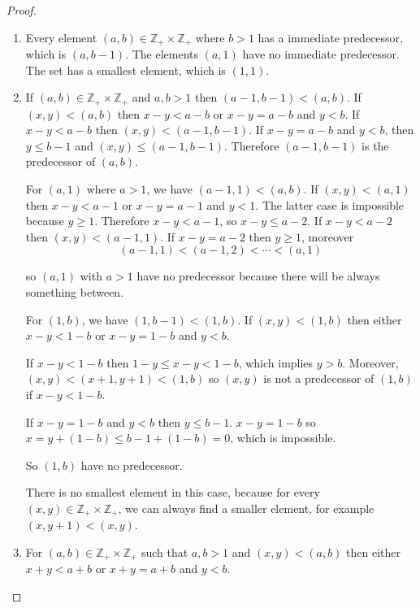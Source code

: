 \begin{proof}
    \begin{enumerate}[label={(\roman*)}]
        \item Every element $(a, b)\in \mathbb{Z}_{+}\times\mathbb{Z}_{+}$ where $b > 1$ has a immediate predecessor, which is $(a, b-1)$. The elements $(a, 1)$ have no immediate predecessor. The set has a smallest element, which is $(1, 1)$.
        \item If $(a, b)\in\mathbb{Z}_{+}\times\mathbb{Z}_{+}$ and $a, b > 1$ then $(a-1, b-1) < (a, b)$. If $(x, y) < (a, b)$ then $x - y < a - b$ or $x - y = a - b$ and $y < b$. If $x - y < a - b$ then $(x, y) < (a-1, b-1)$. If $x - y = a - b$ and $y < b$, then $y\leq b-1$ and $(x, y)\leq (a-1, b-1)$. Therefore $(a-1, b-1)$ is the predecessor of $(a, b)$.

              For $(a, 1)$ where $a > 1$, we have $(a-1, 1) < (a, b)$. If $(x, y) < (a, 1)$ then $x - y < a - 1$ or $x - y = a - 1$ and $y < 1$. The latter case is impossible because $y\geq 1$. Therefore $x - y < a - 1$, so $x - y\leq a - 2$. If $x - y < a - 2$ then $(x, y) < (a - 1, 1)$. If $x - y = a - 2$ then $y\geq 1$, moreover
              \[
                  (a-1, 1) < (a-1, 2) < \cdots < (a, 1)
              \]

              so $(a, 1)$ with $a > 1$ have no predecessor because there will be always something between.

              For $(1, b)$, we have $(1, b-1) < (1, b)$. If $(x, y) < (1, b)$ then either $x - y < 1 - b$ or $x - y = 1 - b$ and $y < b$.

              If $x - y < 1 - b$ then $1 - y\leq x - y < 1 - b$, which implies $y > b$. Moreover, $(x, y) < (x+1, y+1) < (1, b)$ so $(x, y)$ is not a predecessor of $(1, b)$ if $x - y < 1 - b$.

              If $x - y = 1 - b$ and $y < b$ then $y\leq b - 1$. $x - y = 1 - b$ so $x = y + (1 - b)\leq b - 1 + (1 - b) = 0$, which is impossible.

              So $(1, b)$ have no predecessor.

              There is no smallest element in this case, because for every $(x, y)\in\mathbb{Z}_{+}\times\mathbb{Z}_{+}$, we can always find a smaller element, for example $(x, y+1) < (x, y)$.
        \item For $(a, b)\in\mathbb{Z}_{+}\times\mathbb{Z}_{+}$ such that $a, b > 1$ and $(x, y) < (a, b)$ then either $x + y < a + b$ or $x + y = a + b$ and $y < b$.


\end{enumerate}
\end{proof}
